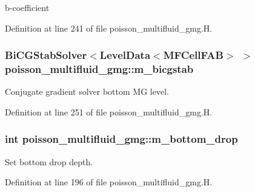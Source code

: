 b-\/coefficient 



Definition at line 241 of file poisson\+\_\+multifluid\+\_\+gmg.\+H.

\subsubsection[{\texorpdfstring{m\+\_\+bicgstab}{m_bicgstab}}]{\setlength{\rightskip}{0pt plus 5cm}Bi\+C\+G\+Stab\+Solver$<$Level\+Data$<$M\+F\+Cell\+F\+AB$>$ $>$ poisson\+\_\+multifluid\+\_\+gmg\+::m\+\_\+bicgstab\hspace{0.3cm}{\ttfamily [protected]}}\hypertarget{classpoisson__multifluid__gmg_ab7efda832efdba8c99625bbf71c90b17}{}\label{classpoisson__multifluid__gmg_ab7efda832efdba8c99625bbf71c90b17}


Conjugate gradient solver bottom MG level. 



Definition at line 251 of file poisson\+\_\+multifluid\+\_\+gmg.\+H.

\subsubsection[{\texorpdfstring{m\+\_\+bottom\+\_\+drop}{m_bottom_drop}}]{\setlength{\rightskip}{0pt plus 5cm}int poisson\+\_\+multifluid\+\_\+gmg\+::m\+\_\+bottom\+\_\+drop\hspace{0.3cm}{\ttfamily [protected]}}\hypertarget{classpoisson__multifluid__gmg_ae0cc80d0227f14a3e15e7799f349b2ac}{}\label{classpoisson__multifluid__gmg_ae0cc80d0227f14a3e15e7799f349b2ac}


Set bottom drop depth. 



Definition at line 196 of file poisson\+\_\+multifluid\+\_\+gmg.\+H.

